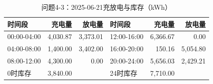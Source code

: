 \begin{table}[H]\centering\small\caption{问题4-3：2025-06-21充放电与库存（kWh）}\label{tab:q4_320250621b}
\begin{tabular}{lrrlrr}\toprule
时间段 & 充电量 & 放电量 & 时间段 & 充电量 & 放电量\\\midrule
00:00-04:00 & 4,030.87 & 3,373.01 & 12:00-16:00 & 6,366.67 & 0.00\\
04:00-08:00 & 1,400.00 & 3,402.00 & 16:00-20:00 & 150.16 & 5,054.80\\
08:00-12:00 & 4,300.00 & 0.00 & 20:00-24:00 & 5,656.03 & 2,429.21\\
0时库存 & 3,840.00 &  & 24时库存 & 7,710.00 & \\
\bottomrule\end{tabular}\end{table}
